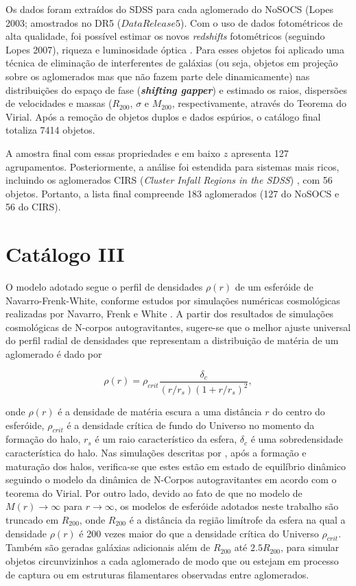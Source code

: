 Os dados foram extraídos do SDSS para cada aglomerado do NoSOCS (Lopes 2003; \cite{lopes2004northern} amostrados no DR5 ($Data Release 5$). Com o uso de dados fotométricos de alta qualidade, foi possível estimar os novos \textit{redshifts} fotométricos (seguindo Lopes 2007), riqueza e luminosidade óptica \cite{lopes2006x}. Para esses objetos foi aplicado uma técnica de eliminação de interferentes de galáxias (ou seja, objetos em projeção sobre os aglomerados mas que não fazem parte dele dinamicamente) nas distribuições do espaço de fase (\textit{\textbf{shifting gapper}}) e estimado os raios,  dispersões de velocidades e massas ($R_{200}$, $\sigma$ e $M_{200}$, respectivamente, através do Teorema do Virial. Após a remoção de objetos duplos e dados espúrios, o catálogo final totaliza 7414 objetos.

A amostra final com essas propriedades e em baixo $z$ apresenta 127 agrupamentos. Posteriormente, a análise foi estendida para sistemas mais ricos, incluindo os aglomerados CIRS (\textit{Cluster Infall Regions in the SDSS}) , com 56 objetos. Portanto, a lista final  compreende 183 aglomerados (127 do NoSOCS e 56 do CIRS). 

\section{Catálogo III}
O modelo adotado segue o perfil de densidades $\rho(r)$ de um esferóide de Navarro-Frenk-White, conforme estudos por simulações numéricas cosmológicas realizadas por Navarro, Frenk e White \cite{NFW1997}. A partir dos resultados de simulações cosmológicas de N-corpos autogravitantes, sugere-se que o melhor ajuste universal do perfil radial de densidades que representam a distribuição de matéria de um aglomerado é dado por

\begin{equation}
\rho(r)=\rho_{crit}\frac{\delta_c}{(r/r_s)(1 + r/r_s)^2},
\label{nfw1}
\end{equation}

\noindent onde $\rho(r)$ é a densidade de matéria escura a uma distância $r$ do centro do esferóide, $\rho_{crit}$ é a densidade crítica de fundo do Universo no momento da formação do halo, $r_s$ é um raio característico da esfera, $\delta_c$ é uma sobredensidade característica do halo. Nas simulações descritas por , após a formação e maturação dos halos, verifica-se que estes estão em estado de equilíbrio dinâmico seguindo o modelo da dinâmica de N-Corpos autogravitantes em acordo com o teorema do Virial. Por outro lado, devido ao fato de que no modelo de  $M(r) \to \infty$ para $r \to \infty$, os modelos de esferóide adotados neste trabalho são truncado em $R_{200}$, onde $R_{200}$ é a distância da região limítrofe da esfera na qual a densidade $\rho(r)$ é 200 vezes maior do que a densidade crítica do Universo $\rho_{crit}$. Também são geradas galáxias adicionais além de $R_{200}$ at\'e $2.5 R_{200}$, para simular objetos circunvizinhos a cada aglomerado de modo que ou estejam em processo de captura ou em estruturas filamentares observadas entre aglomerados.

